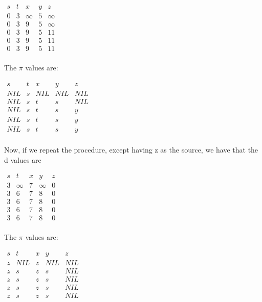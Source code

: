 \documentclass{article}
\begin{document}
\begin{center}
$
\begin{array}{|c|c|c|c|c|c|}
s&t&x&y&z\\
\hline
0&3&\infty&5&\infty\\
0&3&9&5&\infty\\
0&3&9&5&11\\
0&3&9&5&11\\
0&3&9&5&11\\
\end{array}
$
\end{center}


The $\pi$ values are:

\begin{center}
$
\begin{array}{|c|c|c|c|c|c|}
s&t&x&y&z\\
\hline
NIL&s&NIL&NIL&NIL\\
NIL&s&t&s&NIL\\
NIL&s&t&s&y\\
NIL&s&t&s&y\\
NIL&s&t&s&y\\
\end{array}
$
\end{center}

Now, if we repeat the procedure, except having z as the source, we have that the d values are


\begin{center}
$
\begin{array}{|c|c|c|c|c|c|}
s&t&x&y&z\\
\hline
3&\infty&7&\infty&0\\
3&6&7&8&0\\
3&6&7&8&0\\
3&6&7&8&0\\
3&6&7&8&0\\
\end{array}
$
\end{center}


The $\pi$ values are:

\begin{center}
$
\begin{array}{|c|c|c|c|c|c|}
s&t&x&y&z\\
\hline
z&NIL&z&NIL&NIL\\
z&s&z&s&NIL\\
z&s&z&s&NIL\\
z&s&z&s&NIL\\
z&s&z&s&NIL\\
\end{array}
$
\end{center}
\end{document}
